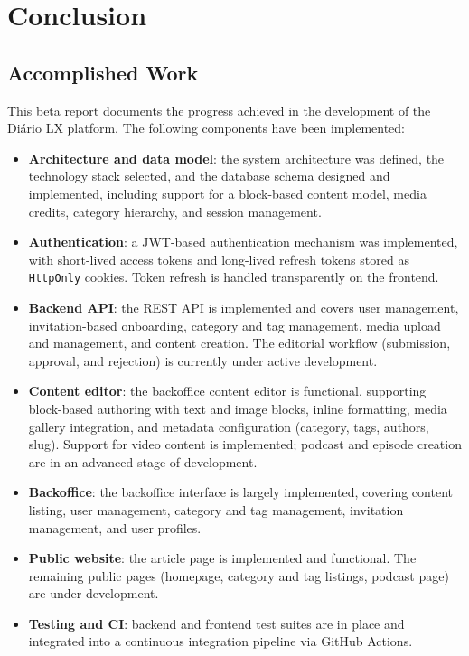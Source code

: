 %
%
\chapter{Conclusion} \label{cap:conclusion}

\section{Accomplished Work} \label{sec:conc_accomplished}

This beta report documents the progress achieved in the development of the Diário
LX platform. The following components have been implemented:

\begin{itemize}
  \item \textbf{Architecture and data model}: the system architecture was defined,
        the technology stack selected, and the database schema designed and implemented,
        including support for a block-based content model, media credits, category
        hierarchy, and session management.

  \item \textbf{Authentication}: a JWT-based authentication mechanism was implemented,
        with short-lived access tokens and long-lived refresh tokens stored as
        \texttt{HttpOnly} cookies. Token refresh is handled transparently on the
        frontend.

  \item \textbf{Backend API}: the REST API is implemented and covers user management,
        invitation-based onboarding, category and tag management, media upload and
        management, and content creation. The editorial workflow (submission, approval,
        and rejection) is currently under active development.

  \item \textbf{Content editor}: the backoffice content editor is functional,
        supporting block-based authoring with text and image blocks, inline formatting,
        media gallery integration, and metadata configuration (category, tags, authors,
        slug). Support for video content is implemented; podcast and episode creation
        are in an advanced stage of development.

  \item \textbf{Backoffice}: the backoffice interface is largely implemented, covering
        content listing, user management, category and tag management, invitation
        management, and user profiles.

  \item \textbf{Public website}: the article page is implemented and functional.
        The remaining public pages (homepage, category and tag listings, podcast page)
        are under development.

  \item \textbf{Testing and CI}: backend and frontend test suites are in place and
        integrated into a continuous integration pipeline via GitHub Actions.
\end{itemize}

